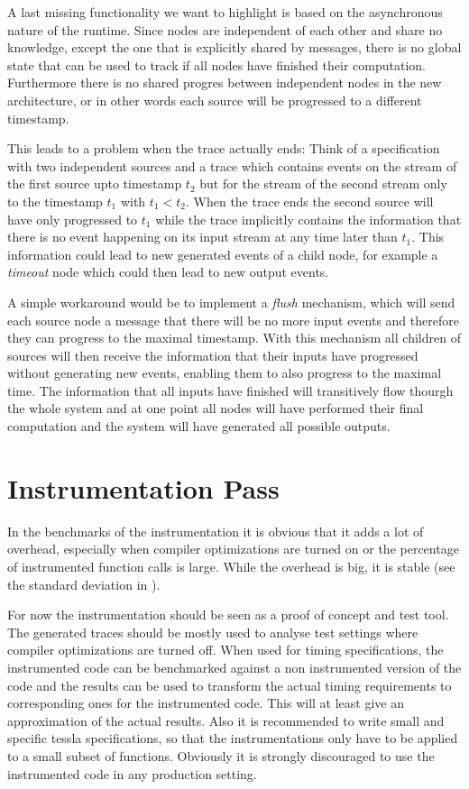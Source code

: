 A last missing functionality we want to highlight is based on the asynchronous nature of the runtime.
Since nodes are independent of each other and share no knowledge, except the one that is explicitly shared by messages, there is no global state that can be used to track if all nodes have finished their computation.
Furthermore there is no shared progres between independent nodes in the new architecture, or in other words each source will be progressed to a different timestamp.

This leads to a problem when the trace actually ends: Think of a specification with two independent sources and a trace which contains events on the stream of the first source upto timestamp \(t_2\) but for the stream of the second stream only to the timestamp \(t_1\) with \(t_1 < t_2\).
When the trace ends the second source will have only progressed to \(t_1\) while the trace implicitly contains the information that there is no event happening on its input stream at any time later than \(t_1\).
This information could lead to new generated events of a child node, for example a \emph{timeout} node which could then lead to new output events.

A simple workaround would be to implement a \emph{flush} mechanism, which will send each source node a message that there will be no more input events and therefore they can progress to the maximal timestamp.
With this mechanism all children of sources will then receive the information that their inputs have progressed without generating new events, enabling them to also progress to the maximal time.
The information that all inputs have finished will transitively flow thourgh the whole system and at one point all nodes will have performed their final computation and the system will have generated all possible outputs.

\section{Instrumentation Pass}

In the benchmarks of the instrumentation it is obvious that it adds a lot of overhead, especially when compiler optimizations are turned on or the percentage of instrumented function calls is large.
While the overhead is big, it is stable (see the standard deviation in ).

For now the instrumentation should be seen as a proof of concept and test tool.
The generated traces should be mostly used to analyse test settings where compiler optimizations are turned off.
When used for timing specifications, the instrumented code can be benchmarked against a non instrumented version of the code and the results can be used to transform the actual timing requirements to corresponding ones for the instrumented code.
This will at least give an approximation of the actual results.
Also it is recommended to write small and specific \gls{tessla} specifications, so that the instrumentations only have to be applied to a small subset of functions.
Obviously it is strongly discouraged to use the instrumented code in any production setting.

